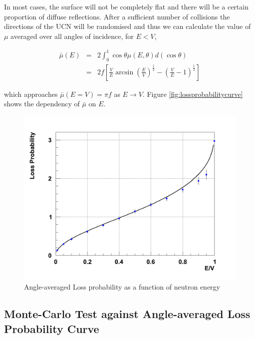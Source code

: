 \documentclass[11pt,a4paper,oneside]{article}
\begin{document}
In most cases, the surface will not be completely flat and there will be a certain proportion of diffuse reflections. After a sufficient number of collisions the directions of the UCN will be randomised and thus we can calculate the value of $\mu$ averaged over all angles of incidence, for $E < V$,

\begin{eqnarray}
\bar{\mu}(E) &=& 2\int_{0}^{1} \cos \theta \mu(E, \theta) d (\cos \theta) \\
 &=& 2f \left[ \frac{V}{E} \arcsin \left( \frac{E}{V} \right) ^{\frac{1}{2}} - \left(\frac{V}{E} - 1 \right)^{\frac{1}{2}} \right]
\label{eqn:angleaveragedlossprobability}
\end{eqnarray}

which approaches $\bar{\mu}(E=V) = \pi f$ as $E \rightarrow V$. Figure \ref{fig:lossprobabilitycurve} shows the dependency of $\bar{\mu}$ on $E$.

\begin{figure}[!htbp] 	
\begin{center}
\includegraphics[scale=0.3]{figures/LossFunction-1000}
\end{center}
\caption{Angle-averaged Loss probability as a function of neutron energy}
\label{fig:NestedBox}
\end{figure}

\subsection{Monte-Carlo Test against Angle-averaged Loss Probability Curve}
\end{document}

